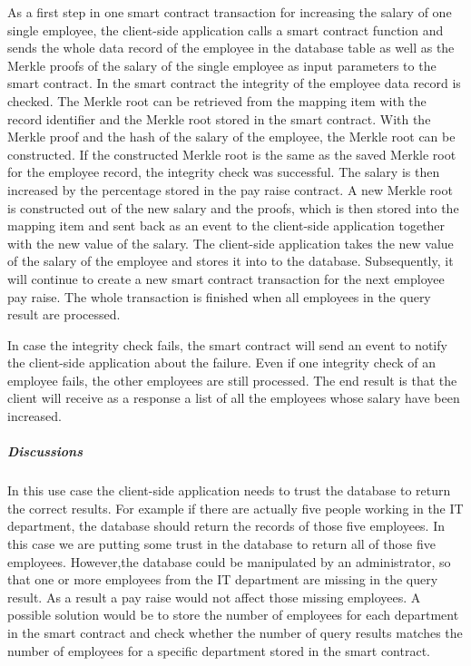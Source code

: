 As a first step in one smart contract transaction for increasing the salary of one single employee, the client-side application calls a smart contract function and sends the whole data record of the employee in the database table as well as the Merkle proofs of the salary of the single employee as input parameters to the smart contract. In the smart contract the integrity of the employee data record is checked. The Merkle root can be retrieved from the mapping item with the record identifier and the Merkle root stored in the smart contract. With the Merkle proof and the hash of the salary of the employee, the Merkle root can be constructed. If the constructed Merkle root is the same as the saved Merkle root for the employee record, the integrity check was successful. The salary is then increased by the percentage stored in the pay raise contract. A new Merkle root is constructed out of the new salary and the proofs, which is then stored into the mapping item and sent back as an event to the client-side application together with the new value of the salary. The client-side application takes the new value of the salary of the employee and stores it into to the database. Subsequently, it will continue to create a new smart contract transaction for the next employee pay raise. The whole transaction is finished when all employees in the query result are processed.

In case the integrity check fails, the smart contract will send an event to notify the client-side application about the failure. Even if one integrity check of an employee fails, the other employees are still processed. The end result is that the client will receive as a response a list of all the employees whose salary have been increased.

\subparagraph{Discussions}

In this use case the client-side application needs to trust the database to return the correct results. For example if there are actually five people working in the IT department, the database should return the records of those five employees. In this case we are putting some trust in the database to return all of those five employees. However,the database could be manipulated by an administrator, so that one or more employees from the IT department are missing in the query result. As a result a pay raise would not affect those missing employees. A possible solution would be to store the number of employees for each department in the smart contract and check whether the number of query results matches the number of employees for a specific department stored in the smart contract.
